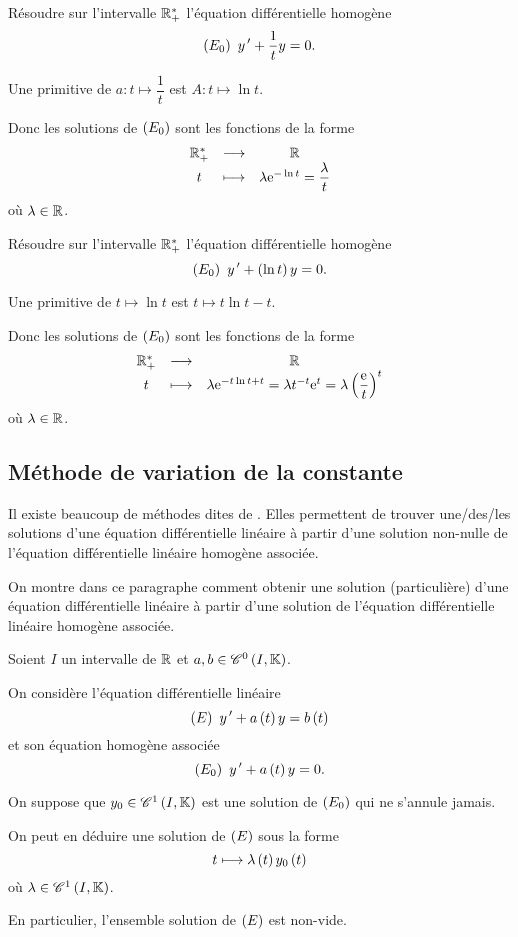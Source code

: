 \begin{exoex}
Résoudre sur l'intervalle \(\mathbb{R}_+^*\) l'équation différentielle homogène \[\left(E_0\right)~y^{\,\prime}+\dfrac{1}{t}y=0.\]
\end{exoex}

\begin{corr}
Une primitive de \(a:t\mapsto\dfrac{1}{t}\) est \(A:t\mapsto\ln t\).

Donc les solutions de \(\left(E_0\right)\) sont les fonctions de la forme \[\begin{array}[t]{ccc}\mathbb{R}_+^* & \longrightarrow & \mathbb{R} \\ t & \longmapsto & \lambda\mathrm{e}^{-\ln t}=\dfrac{\lambda}{t}\end{array}\] où \(\lambda\in\mathbb{R}\).
\end{corr}

\begin{exoex}
Résoudre sur l'intervalle \(\mathbb{R}_+^*\) l'équation différentielle homogène \[\left(E_0\right)~y^{\,\prime}+\left(\ln t\right)y=0.\]
\end{exoex}

\begin{corr}
Une primitive de \(t\mapsto\ln t\) est \(t\mapsto t\ln t-t\).

Donc les solutions de \(\left(E_0\right)\) sont les fonctions de la forme \[\begin{array}[t]{ccc}\mathbb{R}_+^* & \longrightarrow & \mathbb{R} \\ t & \longmapsto & \lambda\mathrm{e}^{-t\ln t+t}=\lambda t^{-t}\mathrm{e}^{t}=\lambda\left(\dfrac{\mathrm{e}^{}}{t}\right)^t\end{array}\] où \(\lambda\in\mathbb{R}\).
\end{corr}

\subsection{Méthode de variation de la constante}

\begin{rem}
Il existe beaucoup de méthodes dites de . Elles permettent de trouver une/des/les solutions d'une équation différentielle linéaire à partir d'une solution non-nulle de l'équation différentielle linéaire homogène associée.

On montre dans ce paragraphe comment obtenir une solution (particulière) d'une équation différentielle linéaire à partir d'une solution de l'équation différentielle linéaire homogène associée.
\end{rem}

\begin{meth}
Soient \(I\) un intervalle de \(\mathbb{R}\) et \(a,b\in\mathscr{C}^{0}\left(I,\mathbb{K}\right)\).

On considère l'équation différentielle linéaire \[\left(E\right)~y^{\,\prime}+a\left(t\right)y=b\left(t\right)\] et son équation homogène associée \[\left(E_0\right)~y^{\,\prime}+a\left(t\right)y=0.\]

On suppose que \(y_0\in\mathscr{C}^{1}\left(I,\mathbb{K}\right)\) est une solution de \(\left(E_0\right)\) qui ne s'annule jamais.

On peut en déduire une solution de \(\left(E\right)\) sous la forme \[t\longmapsto\lambda\left(t\right)y_0\left(t\right)\] où \(\lambda\in\mathscr{C}^{1}\left(I,\mathbb{K}\right)\).

En particulier, l'ensemble solution de \(\left(E\right)\) est non-vide.
\end{meth}

